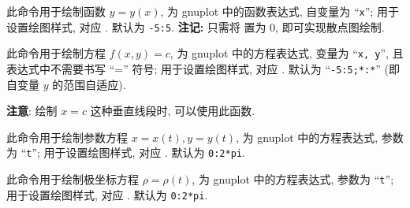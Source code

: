 \documentclass[
  hyper, lang=cn, 
  class=l3dox, 
]{../../zlatex/code/ztex}
\begin{document}
\begin{function}[added=2025-05-15]{\Plot}
  \begin{syntax}
  \end{syntax}
  此命令用于绘制函数 $y=y(x)$,  为 gnuplot 中的函数表达式, 自变量为 ``\texttt{x}'';
   用于设置绘图样式, 对应 . 
  默认为 \texttt{-5:5}. \textbf{注记:} 只需将  置为 0, 即可实现散点图绘制.
\end{function}


\begin{function}[added=2025-05-15]{\ContourPlot}
  \begin{syntax}
  \end{syntax}
  此命令用于绘制方程 $f(x, y)=c$,  为 gnuplot 中的方程表达式, 变量为 ``\texttt{x, y}'', 
  且表达式中不需要书写 ``='' 符号;  用于设置绘图样式, 对应 . 
  默认为 ``\texttt{-5:5;*:*}'' (即自变量 $y$ 的范围自适应).\par 
  \noindent\textbf{注意}: 绘制 $x=c$ 这种垂直线段时, 可以使用此函数.
\end{function}



\begin{function}[added=2025-05-15]{\ParamPlot}
  \begin{syntax}
  \end{syntax}
  此命令用于绘制参数方程 $x=x(t), y=y(t)$,  为 gnuplot 中的方程表达式, 参数为 ``\texttt{t}'';
   用于设置绘图样式, 对应 . 
  默认为 \texttt{0:2*pi}.
\end{function}



\begin{function}[added=2025-05-15]{\PolarPlot}
  \begin{syntax}
  \end{syntax}
  此命令用于绘制极坐标方程 $\rho=\rho(t)$,  为 gnuplot 中的方程表达式, 参数为 ``\texttt{t}'';
   用于设置绘图样式, 对应 . 
  默认为 \texttt{0:2*pi}.
\end{function}
\end{document}
